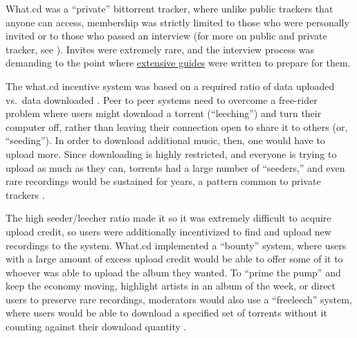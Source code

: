 \documentclass[notoc]{tufte-book}
\begin{document}
What.cd was a ``private'' bittorrent tracker, where unlike public
trackers that anyone can access, membership was strictly limited to
those who were personally invited or to those who passed an interview
(for more on public and private tracker, see \citep{meulpolderPublicPrivateBitTorrent} ). Invites were extremely rare,
and the interview process was demanding to the point where
\href{https://opentrackers.org/whatinterviewprep.com/index.html}{extensive
guides} were written to prepare for them.

The what.cd incentive system was based on a required ratio of data
uploaded vs.~data downloaded \citep{jiaHowSurviveThrive2013} .
Peer to peer systems need to overcome a free-rider problem where users
might download a torrent (``leeching'') and turn their computer off,
rather than leaving their connection open to share it to others (or,
``seeding''). In order to download additional music, then, one would
have to upload more. Since downloading is highly restricted, and
everyone is trying to upload as much as they can, torrents had a large
number of ``seeders,'' and even rare recordings would be sustained for
years, a pattern common to private trackers \citep{liuUnderstandingImprovingRatio2010} .

The high seeder/leecher ratio made it so it was extremely difficult to
acquire upload credit, so users were additionally incentivized to find
and upload new recordings to the system. What.cd implemented a
``bounty'' system, where users with a large amount of excess upload
credit would be able to offer some of it to whoever was able to upload
the album they wanted. To ``prime the pump'' and keep the economy
moving, highlight artists in an album of the week, or direct users to
preserve rare recordings, moderators would also use a ``freeleech''
system, where users would be able to download a specified set of
torrents without it counting against their download quantity \citep{kashEconomicsBitTorrentCommunities2012, chenImprovingSustainabilityPrivate2011a} .
\end{document}

